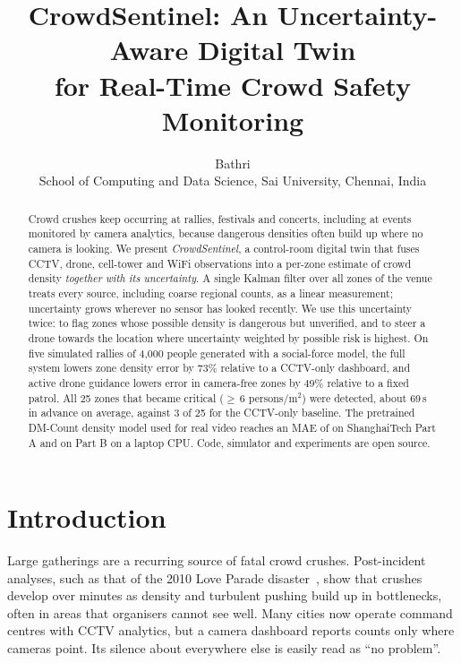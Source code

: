 \documentclass[10pt,twocolumn]{article}
\title{\vspace{-8mm}\textbf{CrowdSentinel: An Uncertainty-Aware Digital Twin\\for Real-Time Crowd Safety Monitoring}}
\author{Bathri\\
\small School of Computing and Data Science, Sai University, Chennai, India}
\date{}
\begin{document}
\maketitle

\begin{abstract}
Crowd crushes keep occurring at rallies, festivals and concerts, including at events monitored by camera analytics, because dangerous densities often build up where no camera is looking. We present \emph{CrowdSentinel}, a control-room digital twin that fuses CCTV, drone, cell-tower and WiFi observations into a per-zone estimate of crowd density \emph{together with its uncertainty}. A single Kalman filter over all zones of the venue treats every source, including coarse regional counts, as a linear measurement; uncertainty grows wherever no sensor has looked recently. We use this uncertainty twice: to flag zones whose possible density is dangerous but unverified, and to steer a drone towards the location where uncertainty weighted by possible risk is highest. On five simulated rallies of 4{,}000 people generated with a social-force model, the full system lowers zone density error by 73\% relative to a CCTV-only dashboard, and active drone guidance lowers error in camera-free zones by 49\% relative to a fixed patrol. All 25 zones that became critical ($\geq$\,6 persons/m$^2$) were detected, about 69\,s in advance on average, against 3 of 25 for the CCTV-only baseline. The pretrained DM-Count density model used for real video reaches an MAE of \VisAMAE{} on ShanghaiTech Part A and \VisBMAE{} on Part B on a laptop CPU. Code, simulator and experiments are open source.
\end{abstract}

\section{Introduction}
Large gatherings are a recurring source of fatal crowd crushes. Post-incident analyses, such as that of the 2010 Love Parade disaster~\cite{helbing2012love}, show that crushes develop over minutes as density and turbulent pushing build up in bottlenecks, often in areas that organisers cannot see well. Many cities now operate command centres with CCTV analytics, but a camera dashboard reports counts only where cameras point. Its silence about everywhere else is easily read as ``no problem''.
\end{document}
